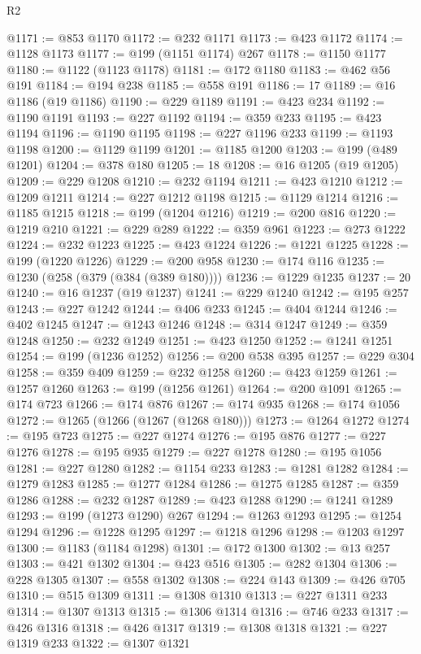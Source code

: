 \begin{lexlean}{R2}
\begin{coremodule}
@1171 := @853 @1170
@1172 := @232 @1171
@1173 := @423 @1172
@1174 := @1128 @1173
@1177 := @199 (@1151 @1174) @267
@1178 := @1150 @1177
@1180 := @1122 (@1123 @1178)
@1181 := @172 @1180
@1183 := @462 @56 @191
@1184 := @194 @238
@1185 := @558 @191
@1186 := 17
@1189 := @16 @1186 (@19 @1186)
@1190 := @229 @1189
@1191 := @423 @234
@1192 := @1190 @1191
@1193 := @227 @1192
@1194 := @359 @233
@1195 := @423 @1194
@1196 := @1190 @1195
@1198 := @227 @1196 @233
@1199 := @1193 @1198
@1200 := @1129 @1199
@1201 := @1185 @1200
@1203 := @199 (@489 @1201)
@1204 := @378 @180
@1205 := 18
@1208 := @16 @1205 (@19 @1205)
@1209 := @229 @1208
@1210 := @232 @1194
@1211 := @423 @1210
@1212 := @1209 @1211
@1214 := @227 @1212 @1198
@1215 := @1129 @1214
@1216 := @1185 @1215
@1218 := @199 (@1204 @1216)
@1219 := @200 @816
@1220 := @1219 @210
@1221 := @229 @289
@1222 := @359 @961
@1223 := @273 @1222
@1224 := @232 @1223
@1225 := @423 @1224
@1226 := @1221 @1225
@1228 := @199 (@1220 @1226)
@1229 := @200 @958
@1230 := @174 @116
@1235 := @1230 (@258 (@379 (@384 (@389 @180))))
@1236 := @1229 @1235
@1237 := 20
@1240 := @16 @1237 (@19 @1237)
@1241 := @229 @1240
@1242 := @195 @257
@1243 := @227 @1242
@1244 := @406 @233
@1245 := @404 @1244
@1246 := @402 @1245
@1247 := @1243 @1246
@1248 := @314 @1247
@1249 := @359 @1248
@1250 := @232 @1249
@1251 := @423 @1250
@1252 := @1241 @1251
@1254 := @199 (@1236 @1252)
@1256 := @200 @538 @395
@1257 := @229 @304
@1258 := @359 @409
@1259 := @232 @1258
@1260 := @423 @1259
@1261 := @1257 @1260
@1263 := @199 (@1256 @1261)
@1264 := @200 @1091
@1265 := @174 @723
@1266 := @174 @876
@1267 := @174 @935
@1268 := @174 @1056
@1272 := @1265 (@1266 (@1267 (@1268 @180)))
@1273 := @1264 @1272
@1274 := @195 @723
@1275 := @227 @1274
@1276 := @195 @876
@1277 := @227 @1276
@1278 := @195 @935
@1279 := @227 @1278
@1280 := @195 @1056
@1281 := @227 @1280
@1282 := @1154 @233
@1283 := @1281 @1282
@1284 := @1279 @1283
@1285 := @1277 @1284
@1286 := @1275 @1285
@1287 := @359 @1286
@1288 := @232 @1287
@1289 := @423 @1288
@1290 := @1241 @1289
@1293 := @199 (@1273 @1290) @267
@1294 := @1263 @1293
@1295 := @1254 @1294
@1296 := @1228 @1295
@1297 := @1218 @1296
@1298 := @1203 @1297
@1300 := @1183 (@1184 @1298)
@1301 := @172 @1300
@1302 := @13 @257
@1303 := @421 @1302
@1304 := @423 @516
@1305 := @282 @1304
@1306 := @228 @1305
@1307 := @558 @1302
@1308 := @224 @143
@1309 := @426 @705
@1310 := @515 @1309
@1311 := @1308 @1310
@1313 := @227 @1311 @233
@1314 := @1307 @1313
@1315 := @1306 @1314
@1316 := @746 @233
@1317 := @426 @1316
@1318 := @426 @1317
@1319 := @1308 @1318
@1321 := @227 @1319 @233
@1322 := @1307 @1321

\end{coremodule}
\end{lexlean}
